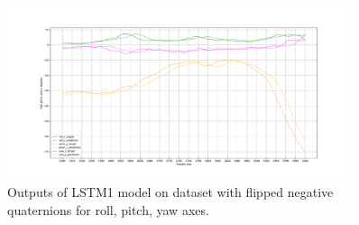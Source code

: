 \begin{figure}
	\begin{center}
		\includegraphics[width=0.9\textwidth, keepaspectratio]{gfx/lstm1_flipped-roll_pitch_yaw.pdf}
		\caption{\label{fig:flip2} Outputs of LSTM1 model on dataset with flipped negative quaternions for roll, pitch, yaw axes.}
	\end{center}
\end{figure}